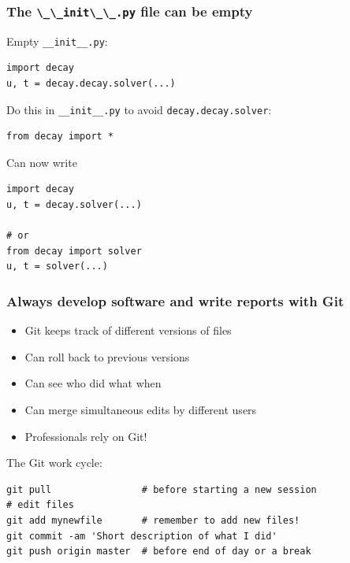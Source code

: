\documentclass{beamer}
\begin{document}
\begin{frame}
\frametitle{The \protect\Verb!\_\_init\_\_.py! file can be empty}

Empty \Verb!__init__.py!:

\begin{verbatim}
import decay
u, t = decay.decay.solver(...)
\end{verbatim}

Do this in \Verb!__init__.py! to avoid \texttt{decay.decay.solver}:

\begin{verbatim}
from decay import *
\end{verbatim}

Can now write

\begin{verbatim}
import decay
u, t = decay.solver(...)

# or
from decay import solver
u, t = solver(...)
\end{verbatim}
\end{frame}

\begin{frame}
\frametitle{Always develop software and write reports with Git}

\begin{itemize}
 \item Git keeps track of different versions of files

 \item Can roll back to previous versions

 \item Can see who did what when

 \item Can merge simultaneous edits by different users

 \item Professionals rely on Git!
\end{itemize}

\noindent
The Git work cycle:

\begin{verbatim}
git pull                # before starting a new session
# edit files
git add mynewfile       # remember to add new files!
git commit -am 'Short description of what I did'
git push origin master  # before end of day or a break
\end{verbatim}
\end{frame}
\end{document}
